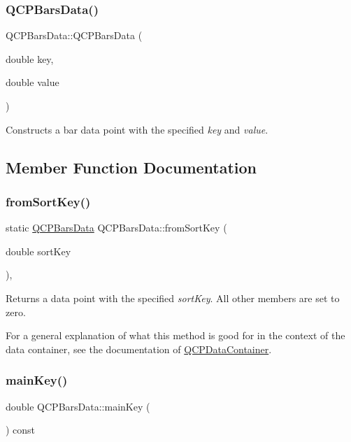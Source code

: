 \subsubsection{\texorpdfstring{Q\+C\+P\+Bars\+Data()}{QCPBarsData()}\hspace{0.1cm}{\footnotesize\ttfamily [2/2]}}
{\footnotesize\ttfamily Q\+C\+P\+Bars\+Data\+::\+Q\+C\+P\+Bars\+Data (\begin{DoxyParamCaption}\item[{double}]{key,  }\item[{double}]{value }\end{DoxyParamCaption})}

Constructs a bar data point with the specified {\itshape key} and {\itshape value}. 

\subsection{Member Function Documentation}
\mbox{\label{classQCPBarsData_ad170d4e90498005ec319338910252ba8}} 
\subsubsection{\texorpdfstring{from\+Sort\+Key()}{fromSortKey()}}
{\footnotesize\ttfamily static \hyperlink{classQCPBarsData}{Q\+C\+P\+Bars\+Data} Q\+C\+P\+Bars\+Data\+::from\+Sort\+Key (\begin{DoxyParamCaption}\item[{double}]{sort\+Key }\end{DoxyParamCaption})\hspace{0.3cm}{\ttfamily [inline]}, {\ttfamily [static]}}

Returns a data point with the specified {\itshape sort\+Key}. All other members are set to zero.

For a general explanation of what this method is good for in the context of the data container, see the documentation of \hyperlink{classQCPDataContainer}{Q\+C\+P\+Data\+Container}. \mbox{\label{classQCPBarsData_a8c1d09e63b0e90a6c1fba56ddeaa8964}} 
\subsubsection{\texorpdfstring{main\+Key()}{mainKey()}}
{\footnotesize\ttfamily double Q\+C\+P\+Bars\+Data\+::main\+Key (\begin{DoxyParamCaption}{ }\end{DoxyParamCaption}) const\hspace{0.3cm}{\ttfamily [inline]}}

